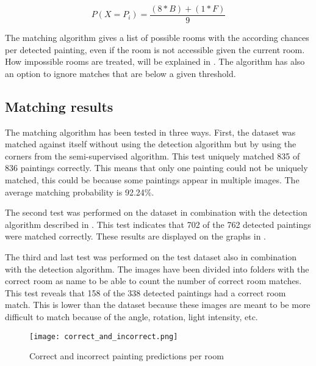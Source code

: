 \begin{equation}
    \label{eq:histogram-score}
    P(X = P_{i}) = \frac{(8 * B) + (1 * F)}{9}
\end{equation}

The matching algorithm gives a list of possible rooms with the according chances per detected painting, even if the room is not accessible given the current room. How impossible rooms are treated, will be explained in . The algorithm has also an option to ignore matches that are below a given threshold.

\subsection{Matching results}
The matching algorithm has been tested in three ways. First, the dataset was matched against itself without using the detection algorithm but by using the corners from the semi-supervised algorithm. This test uniquely matched 835 of 836 paintings correctly. This means that only one painting could not be uniquely matched, this could be because some paintings appear in multiple images. The average matching probability is 92.24\%.

The second test was performed on the dataset in combination with the detection algorithm described in . This test indicates that 702 of the 762 detected paintings were matched correctly. These results are displayed on the graphs in .

The third and last test was performed on the test dataset also in combination with the detection algorithm. The images have been divided into folders with the correct room as name to be able to count the number of correct room matches. This test reveals that 158 of the 338 detected paintings had a correct room match. This is lower than the dataset because these images are meant to be more difficult to match because of the angle, rotation, light intensity, etc.

\begin{figure}
    \centering
    \texttt{[image: correct\_and\_incorrect.png]}

    \caption{Correct and incorrect painting predictions per room}
    \label{fig:correct-incorrect-paintings}
\end{figure}
